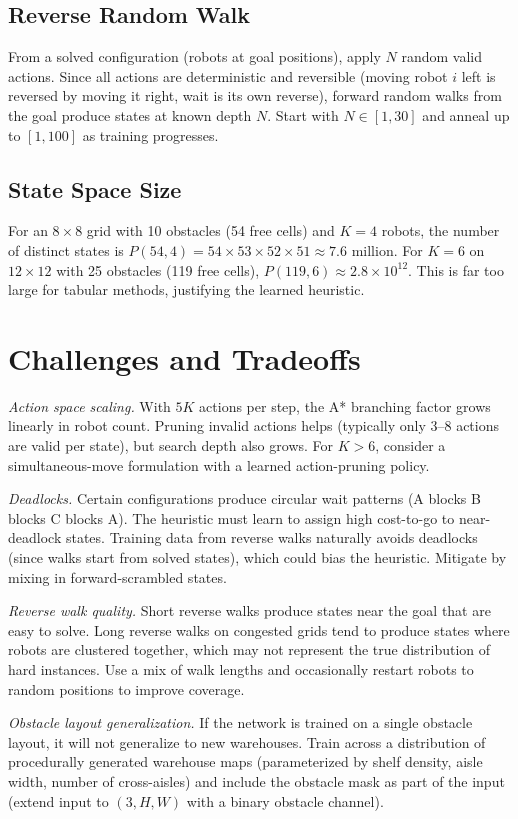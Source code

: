 \documentclass[11pt]{article}
\begin{document}
\subsection{Reverse Random Walk}

From a solved configuration (robots at goal positions), apply $N$ random valid actions. Since all actions are deterministic and reversible (moving robot $i$ left is reversed by moving it right, wait is its own reverse), forward random walks from the goal produce states at known depth $N$. Start with $N \in [1, 30]$ and anneal up to $[1, 100]$ as training progresses.

\subsection{State Space Size}

For an $8 \times 8$ grid with 10 obstacles (54 free cells) and $K = 4$ robots, the number of distinct states is $P(54, 4) = 54 \times 53 \times 52 \times 51 \approx 7.6$ million. For $K = 6$ on $12 \times 12$ with 25 obstacles (119 free cells), $P(119, 6) \approx 2.8 \times 10^{12}$. This is far too large for tabular methods, justifying the learned heuristic.

\section{Challenges and Tradeoffs}

\textit{Action space scaling.} With $5K$ actions per step, the A* branching factor grows linearly in robot count. Pruning invalid actions helps (typically only 3--8 actions are valid per state), but search depth also grows. For $K > 6$, consider a simultaneous-move formulation with a learned action-pruning policy.

\textit{Deadlocks.} Certain configurations produce circular wait patterns (A blocks B blocks C blocks A). The heuristic must learn to assign high cost-to-go to near-deadlock states. Training data from reverse walks naturally avoids deadlocks (since walks start from solved states), which could bias the heuristic. Mitigate by mixing in forward-scrambled states.

\textit{Reverse walk quality.} Short reverse walks produce states near the goal that are easy to solve. Long reverse walks on congested grids tend to produce states where robots are clustered together, which may not represent the true distribution of hard instances. Use a mix of walk lengths and occasionally restart robots to random positions to improve coverage.

\textit{Obstacle layout generalization.} If the network is trained on a single obstacle layout, it will not generalize to new warehouses. Train across a distribution of procedurally generated warehouse maps (parameterized by shelf density, aisle width, number of cross-aisles) and include the obstacle mask as part of the input (extend input to $(3, H, W)$ with a binary obstacle channel).
\end{document}
